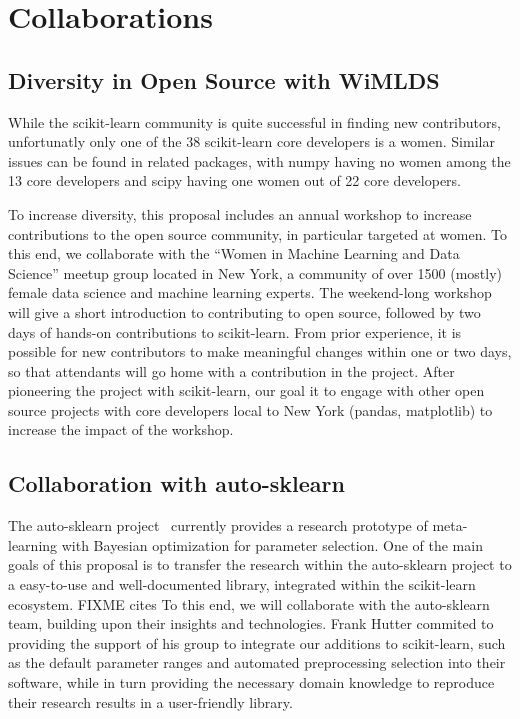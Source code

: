 \section{Collaborations}
\subsection{Diversity in Open Source with WiMLDS}
While the scikit-learn community is quite successful in finding new contributors,
unfortunatly only one of the 38 scikit-learn core developers is a women.
Similar issues can be found in related packages, with numpy having no women among the 13 core
developers and scipy having one women out of 22 core developers.

To increase diversity, this proposal includes an annual workshop to increase
contributions to the open source community, in particular targeted at women.
To this end, we collaborate with the ``Women in Machine Learning and Data Science''
meetup group located in New York, a community of over 1500 (mostly) female data science and
machine learning experts.
The weekend-long workshop will give a short introduction to contributing to open source,
followed by two days of hands-on contributions to scikit-learn.
From prior experience, it is possible for new contributors to make meaningful changes
within one or two days, so that attendants will go home with a contribution
in the project. After pioneering the project with scikit-learn, our goal
it to engage with other open source projects with core developers local to New York
(pandas, matplotlib) to increase the impact of the workshop.

\subsection{Collaboration with auto-sklearn}
The auto-sklearn project~\cite{feurer-nips2015} currently provides a research
prototype of meta-learning with Bayesian optimization for parameter selection.
One of the main goals of this proposal is to transfer the research within the
auto-sklearn project to a easy-to-use and well-documented library, integrated
within the scikit-learn ecosystem. FIXME cites To this end, we will collaborate
with the auto-sklearn team, building upon their insights and technologies.
Frank Hutter commited to providing the support of his group to integrate our
additions to scikit-learn, such as the default parameter ranges and automated
preprocessing selection into their software, while in turn providing the
necessary domain knowledge to reproduce their research results in a
user-friendly library.

